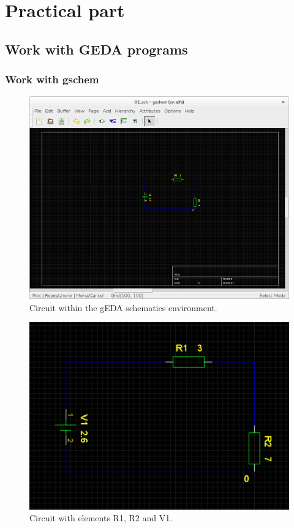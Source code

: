 \documentclass{report}
\begin{document}
\newpage
\chapter{Practical part}

\section{Work with GEDA programs}
\newpage
\subsection{Work with gschem}


\begin{figure}[!ht]
\centering
\includegraphics[width=.83\linewidth]{gschem_1}
\caption{Circuit within the gEDA schematics environment. \cite{geda}}
\end{figure}
\vspace*{\floatsep}
\begin{figure}[!hb]
\centering
\includegraphics[width=.83\linewidth]{gschem_2}
\caption{Circuit with elements R1, R2 and V1.}
\label{i:gschem}
\end{figure}
\end{document}
